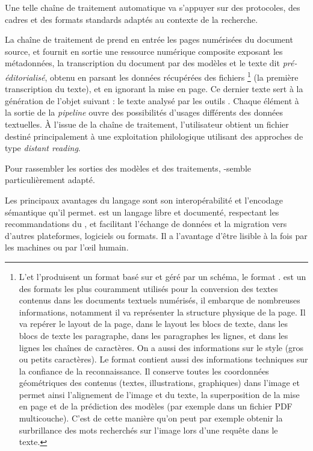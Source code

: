 Une telle chaîne de traitement automatique va s'appuyer sur des protocoles, des cadres et des formats standards adaptés au contexte de la recherche. 

La chaîne de traitement de \gaga prend en entrée les pages numérisées du document
source, et fournit en sortie une ressource numérique composite exposant
les métadonnées, la transcription du document par des
modèles \htr et le texte dit \textit{pré-éditorialisé}, obtenu en parsant les données
récupérées des fichiers \alto\footnote{L'\ocr et l'\htr produisent un
  format basé sur \xml et géré par un schéma, le format \alto. \alto est un des formats les
  plus couramment utilisés pour la conversion des textes contenus dans
  les documents textuels numérisés, il embarque de nombreuses
  informations, notamment il va représenter la structure physique de la
  page. Il va repérer le layout de la page, dans le layout les blocs de
  texte, dans les blocs de texte les paragraphe, dans les paragraphes
  les lignes, et dans les lignes les chaînes de caractères. On a aussi
  des informations sur le style (gros ou petits caractères). Le format
  \alto contient aussi des informations techniques sur la confiance de la
  reconnaissance. Il conserve toutes les coordonnées géométriques des
  contenus (textes, illustrations, graphiques) dans l'image et permet
  ainsi l'alignement de l'image et du texte, la superposition de la mise
  en page et de la prédiction des modèles (par exemple dans un fichier
  PDF multicouche). C'est de cette manière qu'on peut par exemple
  obtenir la surbrillance des mots recherchés sur l'image lors d'une
  requête dans le texte.} (la première transcription du texte), et en
ignorant la mise en page. Ce dernier texte sert à la génération de
l'objet suivant : le texte analysé par les outils \tal. Chaque élément à
la sortie de la \textit{pipeline} ouvre des possibilités d'usages différents des
données textuelles. À l'issue de la chaîne de traitement, l'utilisateur
obtient un fichier \tei destiné principalement à une exploitation
philologique utilisant des approches de type \textit{distant reading}. 

Pour rassembler les sorties des modèles et des traitements, \xml-\tei semble particulièrement adapté.

Les principaux avantages du langage \xml sont son interopérabilité et l'encodage sémantique qu'il permet. \xml est un langage libre et documenté, respectant les recommandations du \wtc, et facilitant l'échange de données et la migration vers d'autres plateformes, logiciels ou formats. Il a l'avantage d'être lisible à la fois par les machines ou par l’œil humain.

